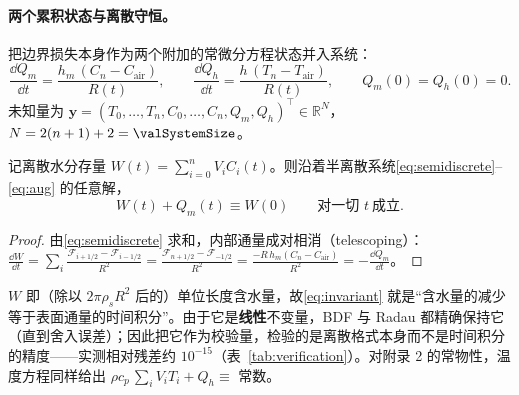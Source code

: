 \paragraph{两个累积状态与离散守恒。} 把边界损失本身作为两个附加的常微分方程状态并入系统：
\begin{equation}
\frac{\dd Q_m}{\dd t}=\frac{h_m\,(C_n-C_{\mathrm{air}})}{R(t)},\qquad
\frac{\dd Q_h}{\dd t}=\frac{h\,(T_n-T_{\mathrm{air}})}{R(t)},\qquad Q_m(0)=Q_h(0)=0 .
\label{eq:aug}
\end{equation}
未知量为 $\bm y=(T_0,\dots,T_n,C_0,\dots,C_n,Q_m,Q_h)^{\!\top}\in\mathbb R^{N}$，$N=2(n+1)+2=\valSystemSize$。

\begin{proposition}[离散水分守恒是精确的线性不变量]\label{prop:conserve}
记离散水分存量 $W(t)=\sum_{i=0}^{n}V_iC_i(t)$。则沿着半离散系统\eqref{eq:semidiscrete}--\eqref{eq:aug} 的任意解，
\begin{equation}
W(t)+Q_m(t)\equiv W(0)\qquad\text{对一切 }t\ \text{成立}.
\label{eq:invariant}
\end{equation}
\end{proposition}
\begin{proof}
由\eqref{eq:semidiscrete} 求和，内部通量成对相消（telescoping）：
$\frac{\dd W}{\dd t}=\sum_i\frac{\mathcal F_{i+1/2}-\mathcal F_{i-1/2}}{R^2}=\frac{\mathcal F_{n+1/2}-\mathcal F_{-1/2}}{R^2}=\frac{-R\,h_m(C_n-C_{\mathrm{air}})}{R^2}=-\frac{\dd Q_m}{\dd t}$。
\end{proof}

\noindent
$W$ 即（除以 $2\pi\rho_sR^2$ 后的）单位长度含水量，故\eqref{eq:invariant} 就是“含水量的减少等于表面通量的时间积分”。由于它是\textbf{线性}不变量，BDF 与 Radau 都精确保持它（直到舍入误差）；因此把它作为校验量，检验的是离散格式本身而不是时间积分的精度——实测相对残差约 $10^{-15}$（表~\ref{tab:verification}）。对附录 2 的常物性，温度方程同样给出 $\rho c_p\,\sum_iV_iT_i+Q_h\equiv$ 常数。

